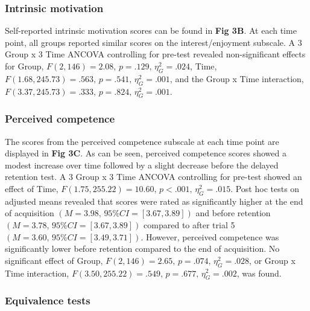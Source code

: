\documentclass[
  english,
  jou]{apa7}
\begin{document}
\hypertarget{intrinsic-motivation}{%
\subsubsection{Intrinsic motivation}\label{intrinsic-motivation}}

Self-reported intrinsic motivation scores can be found in \textbf{Fig 3B}. At each time point, all groups reported similar scores on the interest/enjoyment subscale. A 3 Group x 3 Time ANCOVA controlling for pre-test revealed non-significant effects for Group, \(F(2,146) = 2.08, \,p = .129, \,\eta^2_{G} = .024\), Time, \(F(1.68,245.73) = .563, \,p = .541, \,\eta^2_{G} = .001\), and the Group x Time interaction, \(F(3.37,245.73) = .333, \,p = .824, \,\eta^2_{G} = .001\).

\hypertarget{perceived-competence}{%
\subsubsection{Perceived competence}\label{perceived-competence}}

The scores from the perceived competence subscale at each time point are displayed in \textbf{Fig 3C}. As can be seen, perceived competence scores showed a modest increase over time followed by a slight decrease before the delayed retention test. A 3 Group x 3 Time ANCOVA controlling for pre-test showed an effect of Time, \(F(1.75,255.22) = 10.60, \,p < .001, \,\eta^2_{G} = .015\). Post hoc tests on adjusted means revealed that scores were rated as significantly higher at the end of acquisition \((M = 3.98, \,95\%CI = [3.67,3.89])\) and before retention \((M = 3.78, \,95\%CI = [3.67,3.89])\) compared to after trial 5 \((M = 3.60, \,95\%CI = [3.49,3.71])\). However, perceived competence was significantly lower before retention compared to the end of acquisition. No significant effect of Group, \(F(2,146) = 2.65, \,p = .074, \,\eta^2_{G} = .028\), or Group x Time interaction, \(F(3.50,255.22) = .549, \,p = .677, \,\eta^2_{G} = .002\), was found.

\hypertarget{equivalence-tests}{%
\subsubsection{Equivalence tests}\label{equivalence-tests}}
\end{document}
